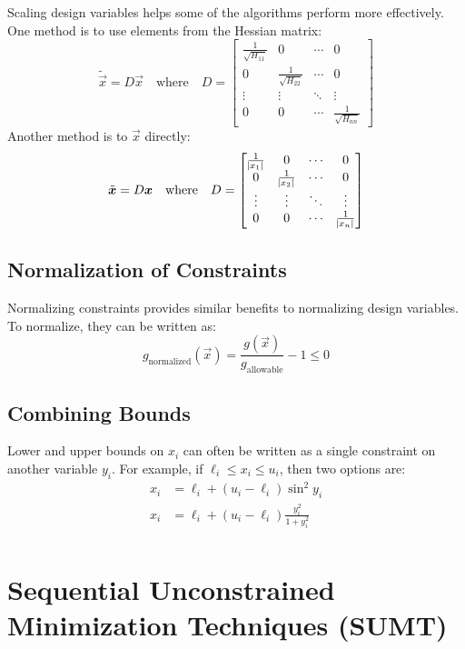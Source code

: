 \documentclass{article}
\begin{document}
Scaling design variables helps some of the algorithms perform more effectively. One method is to use
elements from the Hessian matrix:
\[\tilde{\vec{x}} = D \vec{x} \quad \textrm{where} \quad D =
\begin{bmatrix}
  \frac{1}{\sqrt{H_{11}}} & 0 & \cdots & 0 \\
  0 & \frac{1}{\sqrt{H_{22}}} & \cdots & 0 \\
  \vdots & \vdots & \ddots & \vdots \\
  0 & 0 & \cdots & \frac{1}{\sqrt{H_{nn}}}
\end{bmatrix}\]
Another method is to \(\vec{x}\) directly:
\[\tilde{\bm{x}} = D \bm{x} \quad \textrm{where} \quad D =
\begin{bmatrix}
  \frac{1}{\abs{x_1}} & 0 & \cdots & 0 \\
  0 & \frac{1}{\abs{x_2}} & \cdots & 0 \\
  \vdots & \vdots & \ddots & \vdots \\
  0 & 0 & \cdots & \frac{1}{\abs{x_n}}
\end{bmatrix}\]

\subsection{Normalization of Constraints}

Normalizing constraints provides similar benefits to normalizing design variables. To normalize,
they can be written as:
\[g_\textrm{normalized}(\vec{x}) = \frac{g(\vec{x})}{g_\textrm{allowable}} - 1 \le 0\]

\subsection{Combining Bounds}

Lower and upper bounds on \(x_i\) can often be written as a single constraint on another variable \(y_i\). For example, if \(\ell_i \le x_i \le u_i\), then two options are:
\begin{align*}
  x_i &= \ell_i + (u_i - \ell_i) \sin^2 y_i \\
  x_i &= \ell_i + (u_i - \ell_i) \frac{y_i^2}{1 + y_i^2} \\
\end{align*}

\section{Sequential Unconstrained Minimization Techniques (SUMT)}
\end{document}
